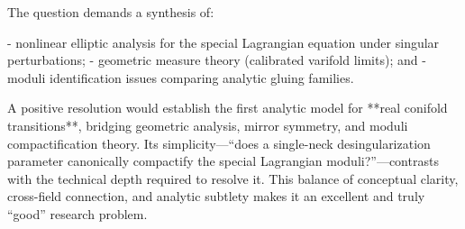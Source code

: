 The question demands a synthesis of:  

- nonlinear elliptic analysis for the special Lagrangian equation under singular perturbations;  
- geometric measure theory (calibrated varifold limits); and  
- moduli identification issues comparing analytic gluing families.  

A positive resolution would establish the first analytic model for **real conifold transitions**, bridging geometric analysis, mirror symmetry, and moduli compactification theory. Its simplicity—“does a single-neck desingularization parameter canonically compactify the special Lagrangian moduli?”—contrasts with the technical depth required to resolve it. This balance of conceptual clarity, cross-field connection, and analytic subtlety makes it an excellent and truly “good” research problem.